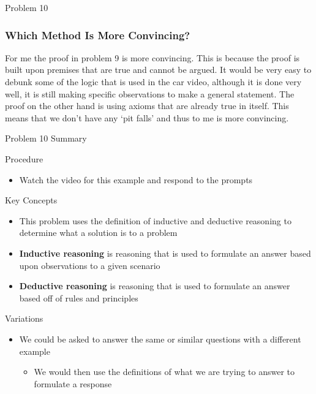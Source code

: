 \begin{problem}{Problem 10}
\begin{Highlight}[Solution]
        \subsubsection*{Which Method Is More Convincing?}

        For me the proof in problem 9 is more convincing. This is because the proof is built upon premises that are true and cannot be argued. It would be very easy to debunk some of
        the logic that is used in the car video, although it is done very well, it is still making specific observations to make a general statement. The proof on the other hand is
        using axioms that are already true in itself. This means that we don't have any `pit falls' and thus to me is more convincing.
        
    \end{Highlight}
\end{problem}

\begin{summary}{Problem 10 Summary}
    \begin{statement}{Procedure}
        \begin{itemize}
            \item Watch the video for this example and respond to the prompts
        \end{itemize}
    \end{statement}
    \begin{statement}{Key Concepts}
        \begin{itemize}
            \item This problem uses the definition of inductive and deductive reasoning to determine what a solution is to a problem
            \item \textbf{Inductive reasoning} is reasoning that is used to formulate an answer based upon observations to a given scenario
            \item \textbf{Deductive reasoning} is reasoning that is used to formulate an answer based off of rules and principles
        \end{itemize}
    \end{statement}
    \begin{statement}{Variations}
        \begin{itemize}
            \item We could be asked to answer the same or similar questions with a different example
            \begin{itemize}
                \item We would then use the definitions of what we are trying to answer to formulate a response
            \end{itemize}
        \end{itemize}
    \end{statement}
\end{summary}